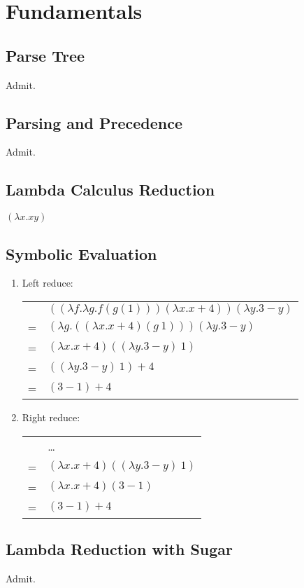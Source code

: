 \chapter{Fundamentals}

\section{Parse Tree}
Admit.


\section{Parsing and Precedence}
Admit.


\section{Lambda Calculus Reduction}
$(\lambda x.xy)$


\section{Symbolic Evaluation}
\begin{enumerate}
  \item Left reduce: \\
  \begin{tabular}{rl}
      & $((\lambda f.\lambda g.f(g(1)))(\lambda x.x+4))(\lambda y.3-y)$ \\
    = & $(\lambda g.((\lambda x.x+4)(g\ 1)))(\lambda y.3-y) $ \\
    = & $(\lambda x.x+4)((\lambda y.3-y)\ 1)$ \\
    = & $((\lambda y.3-y)\ 1)+4$ \\
    = & $(3-1)+4$ \\
  \end{tabular}
  
  \item Right reduce: \\
  \begin{tabular}{rl}
      & \ldots \\
    = & $(\lambda x.x+4)((\lambda y.3-y)\ 1)$ \\
    = & $(\lambda x.x+4)(3-1)$ \\
    = & $(3-1)+4$ \\
  \end{tabular}
\end{enumerate}


\section{Lambda Reduction with Sugar}
Admit.


